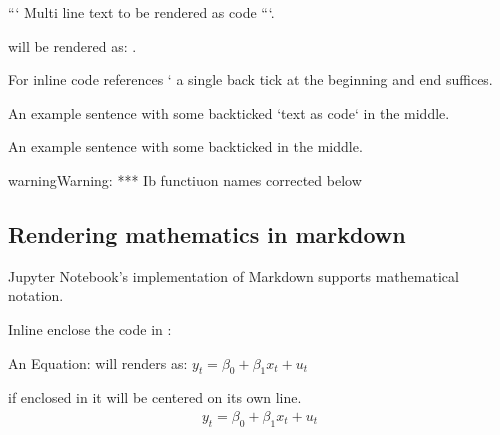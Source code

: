 \documentclass[letterpaper,10pt,english]{jupyterBook}
\begin{document}
\sphinxAtStartPar
```
Multi line
text to be rendered as code
```.

\sphinxAtStartPar
will be rendered as: .

\begin{sphinxVerbatim}[commandchars=\\\{\}]

  
      
\end{sphinxVerbatim}

\sphinxAtStartPar
For inline code references ‘ a single back tick at the beginning and end suffices.

\sphinxAtStartPar
{}

\sphinxAtStartPar
An example sentence with some back\sphinxhyphen{}ticked `text as code` in the middle.

\sphinxAtStartPar
{}

\sphinxAtStartPar
An example sentence with some back\sphinxhyphen{}ticked  in the middle.

\begin{sphinxadmonition}{warning}{Warning:}
\sphinxAtStartPar
*** Ib functiuon names corrected below
\end{sphinxadmonition}


\subsection{Rendering mathematics in markdown}
\label{\detokenize{content/04_PythonEssentials/Intro_Jupyter_notebook:rendering-mathematics-in-markdown}}
\sphinxAtStartPar
Jupyter Notebook’s implementation of Markdown supports  mathematical notation.

\sphinxAtStartPar
Inline enclose the  code in \sphinxcode{\sphinxupquote{\$}}:

\sphinxAtStartPar
An Equation:  will renders as: \(y_t = \beta_0 + \beta_1 x_t + u_t\)

\sphinxAtStartPar
if enclosed in \sphinxcode{\sphinxupquote{\$\$}} \sphinxcode{\sphinxupquote{\$\$}} it will be centered on its own line.
\begin{equation*}
\begin{split}y_t = \beta_0 + \beta_1 x_t + u_t\end{split}
\end{equation*}
\end{document}
